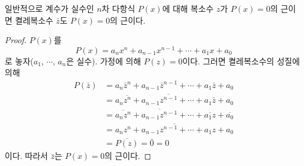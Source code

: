 \documentclass{article}
\begin{document}
\begin{mdframed}%
일반적으로 계수가 실수인 \(n\)차 다항식 \(P(x)\)에 대해 복소수 \(z\)가 \(P(x)=0\)의 근이면 켤레복소수 \(\bar z\)도 \(P(x)=0\)의 근이다.
\end{mdframed}

\begin{proof}
\(P(x)\)를
\[
P(x)=a_nx^n+a_{n-1}x^{n-1}+\cdots+a_1x+a_0
\]
로 놓자(\(a_1\), \(\cdots\), \(a_n\)은 실수).
가정에 의해 \(P(z)=0\)이다.
그러면 켤레복소수의 성질에 의해
\begin{align*}
P(\bar z)
&=a_n\bar z^n+a_{n-1}\bar z^{n-1}+\cdots+a_1\bar z+a_0\\
&=a_n\overline{z^n}+a_{n-1}\overline{z^{n-1}}+\cdots+a_1\bar z+a_0\\
&=\overline{a_nz^n}+\overline{a_{n-1}z^{n-1}}+\cdots+\overline{a_1z}+\overline{a_0}\\
&=\overline{a_nz^n+a_{n-1}z^{n-1}+\cdots+a_1z+a_0}\\
&=\overline{P(z)}=\bar0=0
\end{align*}
이다.
따라서 \(\bar z\)는 \(P(x)=0\)의 근이다.
\end{proof}
\end{document}

